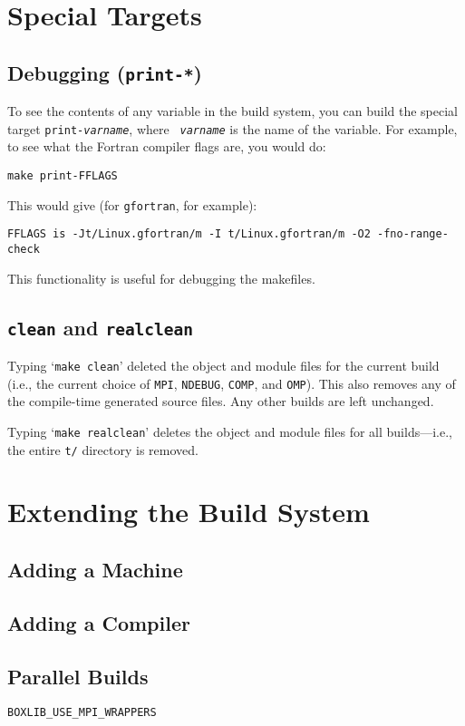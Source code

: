 \section{Special Targets}

\subsection{Debugging ({\tt print-*})}

To see the contents of any variable in the build system, you can build
the special target {\tt print-{\em varname}}, where {\tt {\em
varname}} is the name of the variable.  For example, to see what the
Fortran compiler flags are, you would do:
\begin{verbatim}
make print-FFLAGS
\end{verbatim}
This would give (for {\tt gfortran}, for example):
\begin{verbatim}
FFLAGS is -Jt/Linux.gfortran/m -I t/Linux.gfortran/m -O2 -fno-range-check
\end{verbatim}
This functionality is useful for debugging the makefiles.

\subsection{{\tt clean} and {\tt realclean}}

Typing `{\tt make clean}' deleted the object and module files for the
current build (i.e., the current choice of {\tt MPI}, {\tt NDEBUG},
{\tt COMP}, and {\tt OMP}).  This also removes any of the compile-time
generated source files.  Any other builds are left unchanged.

Typing `{\tt make realclean}' deletes the object and module files for
all builds---i.e., the entire {\tt t/} directory is removed.

\section{Extending the Build System}

\subsection{Adding a Machine}

\subsection{Adding a Compiler}

\subsection{Parallel Builds}

{\tt BOXLIB\_USE\_MPI\_WRAPPERS}



